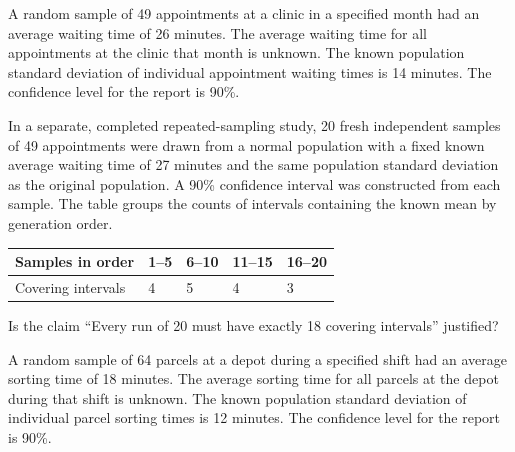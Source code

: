 \clearpage
{}
A random sample of 49 appointments at a clinic in a specified month had an average waiting time of 26 minutes. The average waiting time for all appointments at the clinic that month is unknown. The known population standard deviation of individual appointment waiting times is 14 minutes. The confidence level for the report is 90\%.

In a separate, completed repeated-sampling study, 20 fresh independent samples of 49 appointments were drawn from a normal population with a fixed known average waiting time of 27 minutes and the same population standard deviation as the original population. A 90\% confidence interval was constructed from each sample. The table groups the counts of intervals containing the known mean by generation order.

\begin{center}\begin{tabular}{@{}lllll@{}}\toprule
Samples in order & 1--5 & 6--10 & 11--15 & 16--20\\\midrule
Covering intervals & 4 & 5 & 4 & 3\\
\bottomrule\end{tabular}\end{center}


\BlankInformationTable
\clearpage
{}

Is the claim ``Every run of 20 must have exactly 18 covering intervals'' justified?

\workspace{1.5in}
\vfill

\clearpage
{}
A random sample of 64 parcels at a depot during a specified shift had an average sorting time of 18 minutes. The average sorting time for all parcels at the depot during that shift is unknown. The known population standard deviation of individual parcel sorting times is 12 minutes. The confidence level for the report is 90\%.

